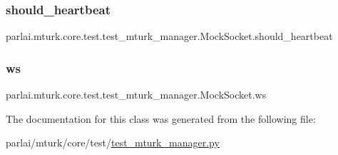 \subsubsection{\texorpdfstring{should\+\_\+heartbeat}{should\_heartbeat}}
{\footnotesize\ttfamily parlai.\+mturk.\+core.\+test.\+test\+\_\+mturk\+\_\+manager.\+Mock\+Socket.\+should\+\_\+heartbeat}

\mbox{\label{classparlai_1_1mturk_1_1core_1_1test_1_1test__mturk__manager_1_1MockSocket_a57efd8037541e77e7130b0c1e043eb5c}} 
\subsubsection{\texorpdfstring{ws}{ws}}
{\footnotesize\ttfamily parlai.\+mturk.\+core.\+test.\+test\+\_\+mturk\+\_\+manager.\+Mock\+Socket.\+ws}



The documentation for this class was generated from the following file\+:\begin{DoxyCompactItemize}
\item 
parlai/mturk/core/test/\hyperlink{test_2test__mturk__manager_8py}{test\+\_\+mturk\+\_\+manager.\+py}\end{DoxyCompactItemize}
